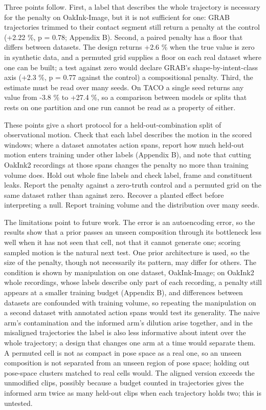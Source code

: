\documentclass[10pt]{article}
\begin{document}
Three points follow. First, a label that describes the whole trajectory is necessary for the penalty on OakInk-Image, but it is not sufficient for one: GRAB trajectories trimmed to their contact segment still return a penalty at the control (+2.22 \%, p = 0.78; Appendix B). Second, a paired penalty has a floor that differs between datasets. The design returns +2.6 \% when the true value is zero in synthetic data, and a permuted grid supplies a floor on each real dataset where one can be built; a test against zero would declare GRAB's shape-by-intent-class axis (+2.3 \%, p = 0.77 against the control) a compositional penalty. Third, the estimate must be read over many seeds. On TACO a single seed returns any value from -3.8 \% to +27.4 \%, so a comparison between models or splits that rests on one partition and one run cannot be read as a property of either.

These points give a short protocol for a held-out-combination split of observational motion. Check that each label describes the motion in the scored windows; where a dataset annotates action spans, report how much held-out motion enters training under other labels (Appendix B), and note that cutting OakInk2 recordings at those spans changes the penalty no more than training volume does. Hold out whole fine labels and check label, frame and constituent leaks. Report the penalty against a zero-truth control and a permuted grid on the same dataset rather than against zero. Recover a planted effect before interpreting a null. Report training volume and the distribution over many seeds.

The limitations point to future work. The error is an autoencoding error, so the results show that a prior passes an unseen composition through its bottleneck less well when it has not seen that cell, not that it cannot generate one; scoring sampled motion is the natural next test. One prior architecture is used, so the size of the penalty, though not necessarily its pattern, may differ for others. The condition is shown by manipulation on one dataset, OakInk-Image; on OakInk2 whole recordings, whose labels describe only part of each recording, a penalty still appears at a smaller training budget (Appendix B), and differences between datasets are confounded with training volume, so repeating the manipulation on a second dataset with annotated action spans would test its generality. The naive arm's contamination and the informed arm's dilution arise together, and in the misaligned trajectories the label is also less informative about intent over the whole trajectory; a design that changes one arm at a time would separate them. A permuted cell is not as compact in pose space as a real one, so an unseen composition is not separated from an unseen region of pose space; holding out pose-space clusters matched to real cells would. The aligned version exceeds the unmodified clips, possibly because a budget counted in trajectories gives the informed arm twice as many held-out clips when each trajectory holds two; this is untested.
\end{document}
